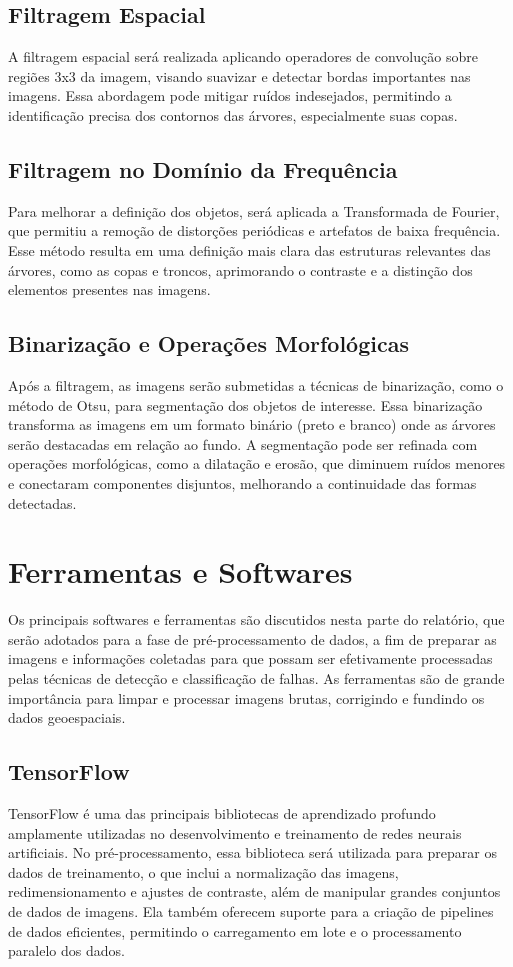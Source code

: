\documentclass[
    12pt,                   %
    openright,              %
    oneside,                %
    a4paper,                %
    sumario=tradicional,    %
    english,                %
    brazil,                 %
    ]{abntex2}
\begin{document}
\subsection{Filtragem Espacial}
    A filtragem espacial será realizada aplicando operadores de convolução sobre regiões 3x3 da imagem, visando suavizar e detectar bordas importantes nas imagens. Essa abordagem pode mitigar ruídos indesejados, permitindo a identificação precisa dos contornos das árvores, especialmente suas copas.

\subsection{Filtragem no Domínio da Frequência}
    Para melhorar a definição dos objetos, será aplicada a Transformada de Fourier, que permitiu a remoção de distorções periódicas e artefatos de baixa frequência. Esse método resulta em uma definição mais clara das estruturas relevantes das árvores, como as copas e troncos, aprimorando o contraste e a distinção dos elementos presentes nas imagens.

\subsection{Binarização e Operações Morfológicas}
    Após a filtragem, as imagens serão submetidas a técnicas de binarização, como o método de Otsu, para segmentação dos objetos de interesse. Essa binarização transforma as imagens em um formato binário (preto e branco) onde as árvores serão destacadas em relação ao fundo. A segmentação pode ser refinada com operações morfológicas, como a dilatação e erosão, que diminuem ruídos menores e conectaram componentes disjuntos, melhorando a continuidade das formas detectadas.

\section{Ferramentas e Softwares}
    Os principais softwares e ferramentas são discutidos nesta parte do relatório, que serão adotados para a fase de pré-processamento de dados, a fim de preparar as imagens e informações coletadas para que possam ser efetivamente processadas pelas técnicas de detecção e classificação de falhas. As ferramentas são de grande importância para limpar e processar imagens brutas, corrigindo e fundindo os dados geoespaciais.

\subsection{TensorFlow}
   TensorFlow é uma das principais bibliotecas de aprendizado profundo amplamente utilizadas no desenvolvimento e treinamento de redes neurais artificiais. No pré-processamento, essa biblioteca será utilizada para preparar os dados de treinamento, o que inclui a normalização das imagens, redimensionamento e ajustes de contraste, além de manipular grandes conjuntos de dados de imagens. Ela também oferecem suporte para a criação de pipelines de dados eficientes, permitindo o carregamento em lote e o processamento paralelo dos dados.
\end{document}
